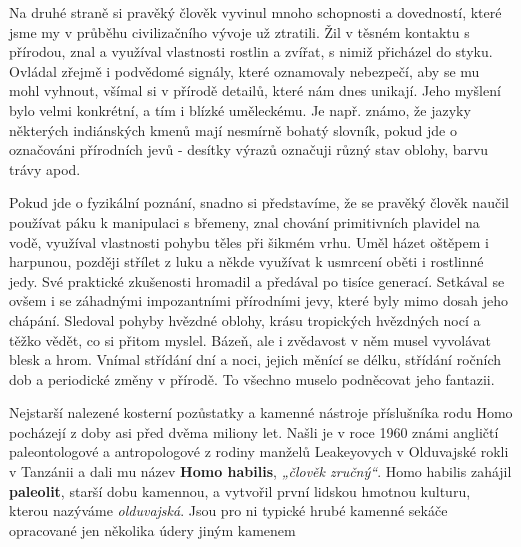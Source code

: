         Na druhé straně si pravěký člověk vyvinul mnoho schopnosti a dovedností, které jsme my v
        průběhu civilizačního vývoje už ztratili. Žil v těsném kontaktu s přírodou, znal a využíval
        vlastnosti rostlin a zvířat, s nimiž přicházel do styku. Ovládal zřejmě i podvědomé signály,
        které oznamovaly nebezpečí, aby se mu mohl vyhnout, všímal si v přírodě detailů, které nám
        dnes unikají. Jeho myšlení bylo velmi konkrétní, a tím i blízké uměleckému. Je např. známo,
        že jazyky některých indiánských kmenů mají nesmírně bohatý slovník, pokud jde o označováni
        přírodních jevů - desítky výrazů označuji různý stav oblohy, barvu trávy apod.

        Pokud jde o fyzikální poznání, snadno si představíme, že se pravěký člověk naučil používat
        páku k manipulaci s břemeny, znal chování primitivních plavidel na vodě, využíval vlastnosti
        pohybu těles při šikmém vrhu. Uměl házet oštěpem i harpunou, později střílet z luku a někde
        využívat k usmrcení oběti i rostlinné jedy. Své praktické zkušenosti hromadil a předával po
        tisíce generací. Setkával se ovšem i se záhadnými impozantními přírodními jevy, které byly
        mimo dosah jeho chápání. Sledoval pohyby hvězdné oblohy, krásu tropických hvězdných nocí a
        těžko vědět, co si přitom myslel. Bázeň, ale i zvědavost v něm musel vyvolávat blesk a hrom.
        Vnímal střídání dní a noci, jejich měnící se délku, střídání ročních dob a periodické změny
        v přírodě. To všechno muselo podněcovat jeho fantazii.

        Nejstarší nalezené kosterní pozůstatky a kamenné nástroje příslušníka rodu Homo pocházejí z
        doby asi před dvěma miliony let. Našli je v roce 1960 známi angličtí paleontologové a
        antropologové z rodiny manželů Leakeyovych v Olduvajské rokli v Tanzánii a dali mu název
        \textbf{Homo habilis}, \emph{„člověk zručný“}. Homo habilis zahájil \textbf{paleolit},
        starší dobu kamennou, a vytvořil první lidskou hmotnou kulturu, kterou nazýváme
        \emph{olduvajská}. Jsou pro ni typické hrubé kamenné sekáče opracované jen několika údery
        jiným kamenem 

